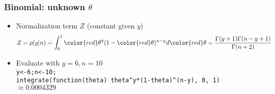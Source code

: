 \documentclass[english,t]{beamer}
\renewcommand{\emph}[1]{\textcolor{navyblue}{#1}}
\begin{document}
\begin{frame}
  \frametitle{Binomial: unknown $\theta$}

  \begin{itemize}
  \item Normalization term $Z$ (constant given $y$)
    \begin{equation*}
      Z=p(y|n)= \int_0^1 {\color{red}\theta}^y(1-{\color{red}\theta})^{n-y} d{\color{red}\theta} = \frac{\Gamma(y+1)\Gamma(n-y+1)}{\Gamma(n+2)}
    \end{equation*}
  \item<2-> Evaluate with $y=6, n=10$\\
    {\scriptsize\texttt{y<-6;n<-10;\\integrate(function(theta) theta\^{}y*(1-theta)\^{}(n-y), 0, 1)} $\approx 0.0004329$}\\
    \\
  \end{itemize}

\end{frame}


\end{document}
